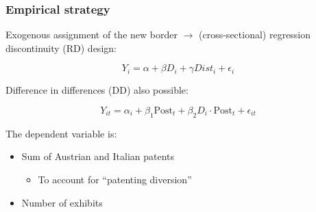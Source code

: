 \documentclass[10pt]{beamer}
\begin{document}
\begin{frame}
    \frametitle{Empirical strategy}
    
    Exogenous assignment of the new border $\rightarrow$ (cross-sectional) regression discontinuity (RD) design:    

    \begin{equation*}
        Y_{i} = \alpha + \beta D_i + \gamma Dist_i + \epsilon_i 
    \end{equation*}

    \bigskip
    
    Difference in differences (DD) also possible:

    \begin{equation*}
        Y_{it} = \alpha_i + \beta_1 \text{Post}_t + \beta_2 D_i \cdot \text{Post}_t + \epsilon_{it}
    \end{equation*}

    \bigskip

    The dependent variable is:

    \begin{itemize}
    
        \item Sum of Austrian and Italian patents
        \begin{itemize}
            \item To account for ``patenting diversion''
        \end{itemize}

        \item Number of exhibits
    
    \end{itemize}
    
    \bigskip

\end{frame}
\end{document}
